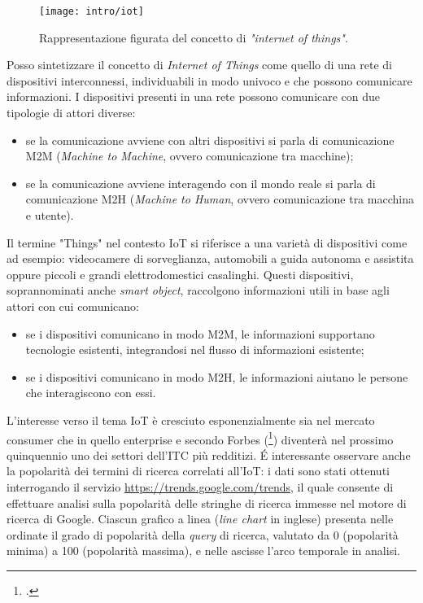 \begin{figure}[H]
    \centering
    \texttt{[image: intro/iot]}
    \caption{Rappresentazione figurata del concetto di \textit{"internet of things"}.}
    \label{fig:iot}
\end{figure}

Posso sintetizzare il concetto di \emph{Internet of Things} come quello di una rete di dispositivi interconnessi, individuabili in modo univoco e che possono comunicare informazioni.
I dispositivi presenti in una rete possono comunicare con due tipologie di attori diverse:
\begin{itemize}
  \item se la comunicazione avviene con altri dispositivi si parla di comunicazione M2M (\textit{Machine to Machine}, ovvero comunicazione tra macchine);
  \item se la comunicazione avviene interagendo con il mondo reale si parla di comunicazione M2H (\textit{Machine to Human}, ovvero comunicazione tra macchina e utente).
\end{itemize}

Il termine "Things" nel contesto IoT si riferisce a una varietà di dispositivi come ad esempio: videocamere di sorveglianza, automobili a guida autonoma e assistita oppure piccoli e grandi elettrodomestici casalinghi. Questi dispositivi, soprannominati anche \textit{smart object}, raccolgono informazioni utili in base agli attori con cui comunicano:
\begin{itemize}
  \item se i dispositivi comunicano in modo M2M, le informazioni supportano tecnologie esistenti, integrandosi nel flusso di informazioni esistente;
  \item se i dispositivi comunicano in modo M2H, le informazioni aiutano le persone che interagiscono con essi.
\end{itemize}

L'interesse verso il tema IoT è cresciuto esponenzialmente sia nel mercato consumer che in quello enterprise e secondo Forbes (\footcite{site:forbes-iot}) diventerà nel prossimo quinquennio uno dei settori dell'ITC più redditizi.
É interessante osservare anche la popolarità dei termini di ricerca correlati all'IoT: i dati sono stati ottenuti interrogando il servizio \url{https://trends.google.com/trends}, il quale consente di effettuare analisi sulla popolarità delle stringhe di ricerca immesse nel motore di ricerca di Google.
Ciascun grafico a linea (\textit{line chart} in inglese) presenta nelle ordinate il grado di popolarità della \textit{query} di ricerca, valutato da 0 (popolarità minima) a 100 (popolarità massima), e nelle ascisse l'arco temporale in analisi.

